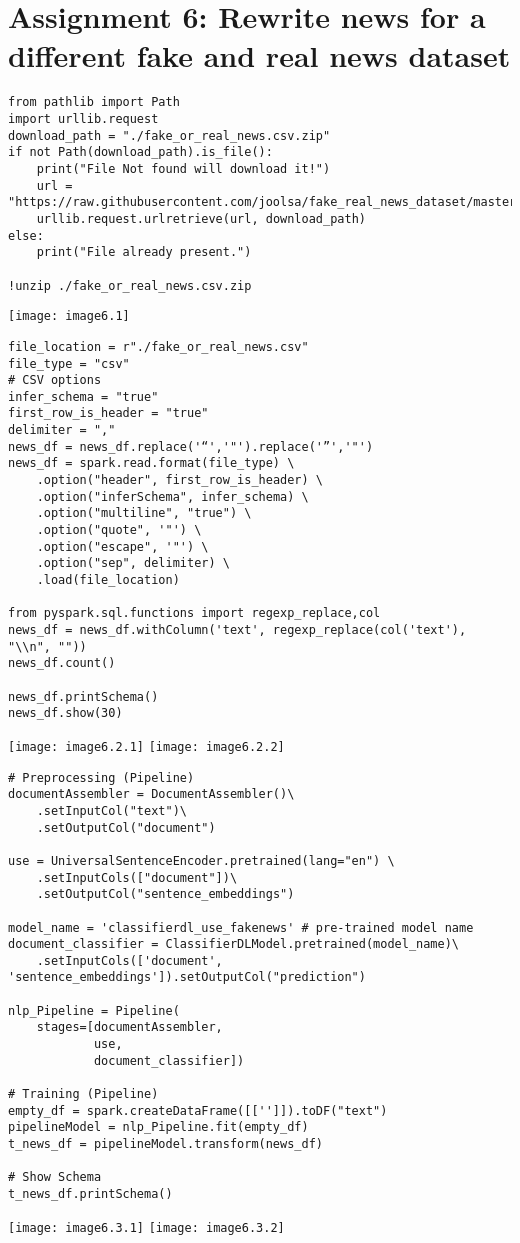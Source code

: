 \documentclass[]{article}
\begin{document}
\section*{Assignment 6: Rewrite news for a different fake and real news dataset}
\begin{verbatim}
from pathlib import Path
import urllib.request
download_path = "./fake_or_real_news.csv.zip"
if not Path(download_path).is_file():
	print("File Not found will download it!")
	url = "https://raw.githubusercontent.com/joolsa/fake_real_news_dataset/master/fake_or_real_news.csv.zip"
	urllib.request.urlretrieve(url, download_path)
else:
	print("File already present.")

!unzip ./fake_or_real_news.csv.zip
\end{verbatim}
\texttt{[image: image6.1]} 


\begin{verbatim}
file_location = r"./fake_or_real_news.csv"
file_type = "csv"
# CSV options
infer_schema = "true"
first_row_is_header = "true"
delimiter = ","
news_df = news_df.replace('“','"').replace('”','"')
news_df = spark.read.format(file_type) \
	.option("header", first_row_is_header) \
	.option("inferSchema", infer_schema) \
	.option("multiline", "true") \
	.option("quote", '"') \
	.option("escape", '"') \
	.option("sep", delimiter) \
	.load(file_location)

from pyspark.sql.functions import regexp_replace,col
news_df = news_df.withColumn('text', regexp_replace(col('text'), "\\n", ""))
news_df.count()

news_df.printSchema()
news_df.show(30)
\end{verbatim}
\texttt{[image: image6.2.1]}
\texttt{[image: image6.2.2]}


\begin{verbatim}
# Preprocessing (Pipeline)
documentAssembler = DocumentAssembler()\
	.setInputCol("text")\
	.setOutputCol("document")

use = UniversalSentenceEncoder.pretrained(lang="en") \
	.setInputCols(["document"])\
	.setOutputCol("sentence_embeddings")

model_name = 'classifierdl_use_fakenews' # pre-trained model name
document_classifier = ClassifierDLModel.pretrained(model_name)\
	.setInputCols(['document', 
'sentence_embeddings']).setOutputCol("prediction")

nlp_Pipeline = Pipeline(
	stages=[documentAssembler, 
			use,
			document_classifier])

# Training (Pipeline)
empty_df = spark.createDataFrame([['']]).toDF("text")
pipelineModel = nlp_Pipeline.fit(empty_df)
t_news_df = pipelineModel.transform(news_df)

# Show Schema
t_news_df.printSchema()
\end{verbatim}
\texttt{[image: image6.3.1]} 
\texttt{[image: image6.3.2]} 
\end{document}
